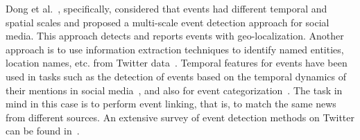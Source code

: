 %
Dong et al.~\cite{Dong2015}, specifically, considered that events had different
temporal and spatial scales and proposed a multi-scale event detection approach
for social media.
%
This approach detects and reports events with geo-localization.
%
Another approach is to use information extraction techniques to identify named
entities, location names, etc. from Twitter
data~\cite{Ritter:2012:ODE:2339530.2339704}.
%
Temporal features for events have been used in tasks such as the detection of
events based on the temporal dynamics of their mentions in social
media~\cite{guille2015event}, and also for event
categorization~\cite{Ritter:2012:ODE:2339530.2339704}. 
%
The task in mind in this case is to perform event linking, that is, to match the
same news from different sources.
%
An extensive survey of event detection methods on Twitter can be found
in~\cite{hasan2018survey}.



